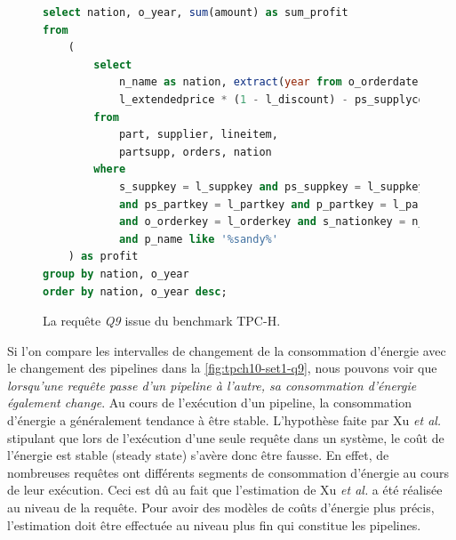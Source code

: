 \begin{figure}
\begin{lstlisting}[language=sql]
select nation, o_year, sum(amount) as sum_profit
from
	(
		select
			n_name as nation, extract(year from o_orderdate) as o_year,
			l_extendedprice * (1 - l_discount) - ps_supplycost * l_quantity as amount
		from
			part, supplier, lineitem,
			partsupp, orders, nation
		where
			s_suppkey = l_suppkey and ps_suppkey = l_suppkey
			and ps_partkey = l_partkey and p_partkey = l_partkey
			and o_orderkey = l_orderkey and s_nationkey = n_nationkey
			and p_name like '%sandy%'
	) as profit
group by nation, o_year
order by nation, o_year desc;
\end{lstlisting}
  \caption{La requête \textit{Q9} issue du benchmark TPC-H.}\label{fig:tpch-q9-sql}
\end{figure}

Si l'on compare les intervalles de changement de la consommation d'énergie avec le changement des pipelines dans la \ref{fig:tpch10-set1-q9}, nous pouvons voir que \textit{lorsqu'une requête passe d'un pipeline à l'autre, sa consommation d'énergie également change}. Au cours de l'exécution d'un pipeline, la consommation d'énergie a généralement tendance à être stable.
L'hypothèse faite par Xu \textit{et al.} stipulant que lors de l'exécution d'une seule requête dans un système, le coût de l'énergie est stable (steady state) \cite{Xu12} s'avère donc être fausse. En effet, de nombreuses requêtes ont différents segments de consommation d'énergie au cours de leur exécution. Ceci est dû au fait que l'estimation de Xu \textit{et al.} a été réalisée au niveau de la requête. Pour avoir des modèles de coûts d'énergie plus précis, l'estimation doit être effectuée au niveau plus fin qui constitue les pipelines.

